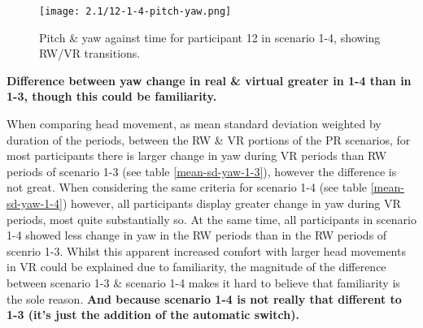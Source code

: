 
\begin{figure}[h]
	\begin{center}
	\texttt{[image: 2.1/12-1-4-pitch-yaw.png]}
	\caption{Pitch \& yaw against time for participant 12 in scenario 1-4, showing RW/VR transitions.}
	\label{12-1-4-pitch-yaw.png}
	\end{center}
\end{figure}

\textbf{Difference between yaw change in real \& virtual greater in 1-4 than in 1-3, though this could be familiarity.}

When comparing head movement, as mean standard deviation weighted by duration of the periods, between the RW \& VR portions of the PR scenarios, for most participants there is larger change in yaw during VR periods than RW periods of scenario 1-3 (see table \ref{mean-sd-yaw-1-3}), however the difference is not great. When considering the same criteria for scenario 1-4 (see table \ref{mean-sd-yaw-1-4}) however, all participants display greater change in yaw during VR periods, most quite substantially so. At the same time, all participants in scenario 1-4 showed less change in yaw in the RW periods than in the RW periods of scenrio 1-3. Whilst this apparent increased comfort with larger head movements in VR could be explained due to familiarity, the magnitude of the difference between scenario 1-3 \& scenario 1-4 makes it hard to believe that familiarity is the sole reason. \textbf{And because scenario 1-4 is not really that different to 1-3 (it's just the addition of the automatic switch).}

